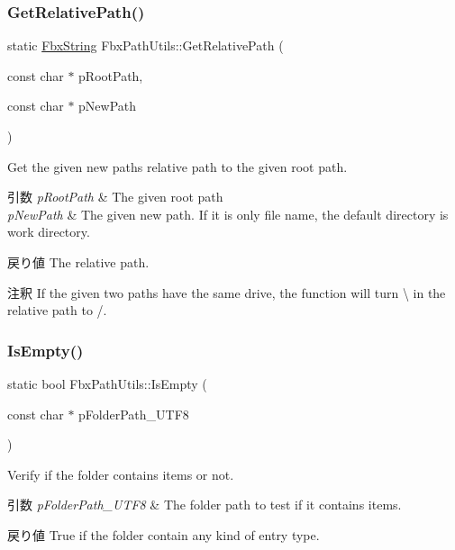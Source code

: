 \subsubsection{\texorpdfstring{Get\+Relative\+Path()}{GetRelativePath()}}
{\footnotesize\ttfamily static \hyperlink{class_fbx_string}{Fbx\+String} Fbx\+Path\+Utils\+::\+Get\+Relative\+Path (\begin{DoxyParamCaption}\item[{const char $\ast$}]{p\+Root\+Path,  }\item[{const char $\ast$}]{p\+New\+Path }\end{DoxyParamCaption})\hspace{0.3cm}{\ttfamily [static]}}

Get the given new path\textquotesingle{}s relative path to the given root path. 
\begin{DoxyParams}{引数}
{\em p\+Root\+Path} & The given root path \\
\hline
{\em p\+New\+Path} & The given new path. If it is only file name, the default directory is work directory. \\
\hline
\end{DoxyParams}
\begin{DoxyReturn}{戻り値}
The relative path. 
\end{DoxyReturn}
\begin{DoxyRemark}{注釈}
If the given two paths have the same drive, the function will turn \textquotesingle{}\textbackslash{}\textquotesingle{} in the relative path to \textquotesingle{}/\textquotesingle{}. 
\end{DoxyRemark}
\mbox{\label{class_fbx_path_utils_a3b887263947d818084273ed982617fec}} 
\subsubsection{\texorpdfstring{Is\+Empty()}{IsEmpty()}}
{\footnotesize\ttfamily static bool Fbx\+Path\+Utils\+::\+Is\+Empty (\begin{DoxyParamCaption}\item[{const char $\ast$}]{p\+Folder\+Path\+\_\+\+U\+T\+F8 }\end{DoxyParamCaption})\hspace{0.3cm}{\ttfamily [static]}}

Verify if the folder contains items or not. 
\begin{DoxyParams}{引数}
{\em p\+Folder\+Path\+\_\+\+U\+T\+F8} & The folder path to test if it contains items. \\
\hline
\end{DoxyParams}
\begin{DoxyReturn}{戻り値}
True if the folder contain any kind of entry type. 
\end{DoxyReturn}
\mbox{\label{class_fbx_path_utils_ad95bc37bf3ed66b0f1d2ab261b238276}} 
